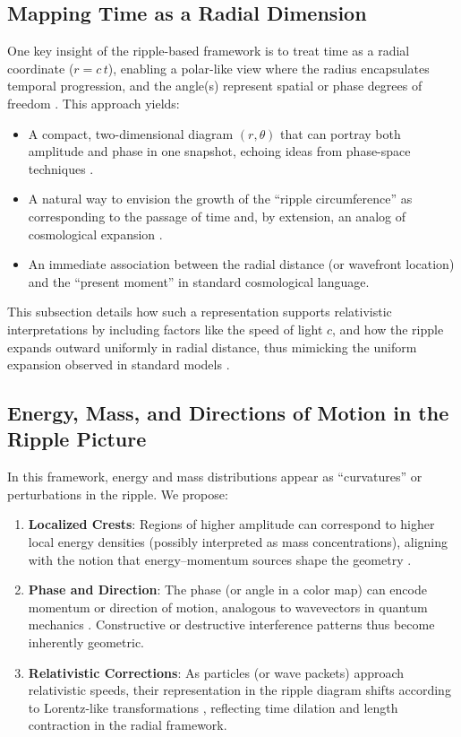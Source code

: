\documentclass{article}
\begin{document}
\subsection{Mapping Time as a Radial Dimension}
\label{subsec:time-radial}
One key insight of the ripple-based framework is to treat time as a radial 
coordinate (\(r = c \, t\)), enabling a polar-like view where the radius 
encapsulates temporal progression, and the angle(s) represent spatial or 
phase degrees of freedom \cite{minkowski1908space, einstein1905}. This 
approach yields:
\begin{itemize}
  \item A compact, two-dimensional diagram \((r, \theta)\) that can portray 
        both amplitude and phase in one snapshot, echoing ideas from 
        phase-space techniques \cite{schleich2001quantum, zachos2005quantum}.
  \item A natural way to envision the growth of the ``ripple circumference'' 
        as corresponding to the passage of time and, by extension, an analog 
        of cosmological expansion \cite{penrose2004}.
  \item An immediate association between the radial distance (or wavefront 
        location) and the ``present moment'' in standard cosmological language.
\end{itemize}

This subsection details how such a representation supports relativistic 
interpretations by including factors like the speed of light \(c\), and how 
the ripple expands outward uniformly in radial distance, thus mimicking the 
uniform expansion observed in standard models \cite{misner1973, rindler1977essential}.

\subsection{Energy, Mass, and Directions of Motion in the Ripple Picture}
\label{subsec:energy-mass}
In this framework, energy and mass distributions appear as ``curvatures'' 
or perturbations in the ripple. We propose:
\begin{enumerate}
  \item \textbf{Localized Crests}: Regions of higher amplitude can correspond 
        to higher local energy densities (possibly interpreted as mass 
        concentrations), aligning with the notion that energy--momentum 
        sources shape the geometry \cite{misner1973}.
  \item \textbf{Phase and Direction}: The phase (or angle in a color map) 
        can encode momentum or direction of motion, analogous to wavevectors 
        in quantum mechanics \cite{griffiths2005introduction}. Constructive 
        or destructive interference patterns thus become inherently geometric.
  \item \textbf{Relativistic Corrections}: As particles (or wave packets) 
        approach relativistic speeds, their representation in the ripple 
        diagram shifts according to Lorentz-like transformations 
        \cite{einstein1905, rindler1977essential}, reflecting time dilation 
        and length contraction in the radial framework.
\end{enumerate}
\end{document}
